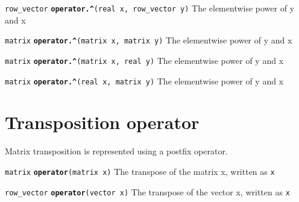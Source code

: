 \documentclass[
  10pt,
]{book}
\begin{document}

\texttt{row\_vector} \textbf{\texttt{operator.\^{}}}\texttt{(real\ x,\ row\_vector\ y)}\newline
The elementwise power of y and x


\texttt{matrix} \textbf{\texttt{operator.\^{}}}\texttt{(matrix\ x,\ matrix\ y)}\newline
The elementwise power of y and x


\texttt{matrix} \textbf{\texttt{operator.\^{}}}\texttt{(matrix\ x,\ real\ y)}\newline
The elementwise power of y and x


\texttt{matrix} \textbf{\texttt{operator.\^{}}}\texttt{(real\ x,\ matrix\ y)}\newline
The elementwise power of y and x

\hypertarget{transposition-operator}{%
\section{Transposition operator}\label{transposition-operator}}

Matrix transposition is represented using a postfix operator.


\texttt{matrix} \textbf{\texttt{operator\textquotesingle{}}}\texttt{(matrix\ x)}\newline
The transpose of the matrix x, written as \texttt{x\textquotesingle{}}


\texttt{row\_vector} \textbf{\texttt{operator\textquotesingle{}}}\texttt{(vector\ x)}\newline
The transpose of the vector x, written as \texttt{x\textquotesingle{}}

\end{document}
